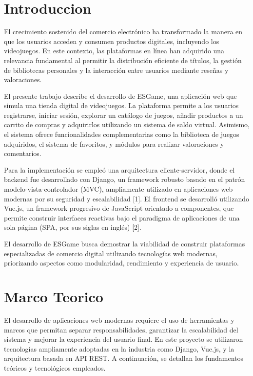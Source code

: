 \documentclass[conference]{IEEEtran}
\begin{document}
\section{Introduccion}
El crecimiento sostenido del comercio electrónico ha transformado la manera en que los usuarios acceden y consumen productos digitales, incluyendo los videojuegos. En este contexto, las plataformas en línea han adquirido una relevancia fundamental al permitir la distribución eficiente de títulos, la gestión de bibliotecas personales y la interacción entre usuarios mediante reseñas y valoraciones.

El presente trabajo describe el desarrollo de ESGame, una aplicación web que simula una tienda digital de videojuegos. La plataforma permite a los usuarios registrarse, iniciar sesión, explorar un catálogo de juegos, añadir productos a un carrito de compras y adquirirlos utilizando un sistema de saldo virtual. Asimismo, el sistema ofrece funcionalidades complementarias como la biblioteca de juegos adquiridos, el sistema de favoritos, y módulos para realizar valoraciones y comentarios.

Para la implementación se empleó una arquitectura cliente-servidor, donde el backend fue desarrollado con Django, un framework robusto basado en el patrón modelo-vista-controlador (MVC), ampliamente utilizado en aplicaciones web modernas por su seguridad y escalabilidad [1]. El frontend se desarrolló utilizando Vue.js, un framework progresivo de JavaScript orientado a componentes, que permite construir interfaces reactivas bajo el paradigma de aplicaciones de una sola página (SPA, por sus siglas en inglés) [2].

El desarrollo de ESGame busca demostrar la viabilidad de construir plataformas especializadas de comercio digital utilizando tecnologías web modernas, priorizando aspectos como modularidad, rendimiento y experiencia de usuario.
 
\section{Marco Teorico}
El desarrollo de aplicaciones web modernas requiere el uso de herramientas y marcos que permitan separar responsabilidades, garantizar la escalabilidad del sistema y mejorar la experiencia del usuario final. En este proyecto se utilizaron tecnologías ampliamente adoptadas en la industria como Django, Vue.js, y la arquitectura basada en API REST. A continuación, se detallan los fundamentos teóricos y tecnológicos empleados.
\end{document}
